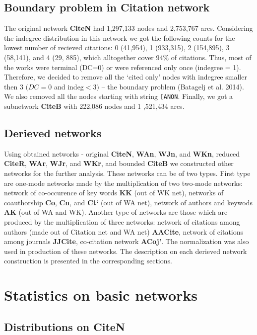 \documentclass[11pt]{article} %
\newcommand{\Remark}[1]{\ifodd\value{page} \normalmarginpar
 \else \reversemarginpar \fi \marginpar{{\footnotesize #1}} }
\begin{document}
\subsection{Boundary problem in Citation network}

The original network \textbf{CiteN} had 1,297,133 nodes and 2,753,767 arcs. Considering the indegree distribution in this network we got the following  counts for the lowest number of recieved citations: 0 (41,954), 1 (933,315), 2 (154,895), 3 (58,141), and 4 (29, 885), which alltogether  cover 94\% of citations. Thus, most of the works were terminal (DC=0) or were referenced only once (indegree = 1). Therefore, we decided to remove all the `cited only' nodes with indegree smaller then 3 $(DC = 0$ and indeg$<3)$ -- the boundary problem (Batagelj et al. 2014). We also removed all the nodes starting with string \texttt{[ANON}.  Finally, we got a subnetwork \textbf{CiteB} with  222,086 nodes and 1 ,521,434 arcs.
			
\subsection{Derieved networks}

\Remark{Move somewhere else}
Using obtained networks - original \textbf{CiteN}, \textbf{WAn}, \textbf{WJn}, and \textbf{WKn}, reduced \textbf{CiteR}, \textbf{WAr}, \textbf{WJr}, and \textbf{WKr}, and bounded \textbf{CiteB} we constructed other networks for the further analysis. These networks can be of two types. First type are one-mode networks made by the multiplication of two two-mode networks: network of co-occurence of key words \textbf{KK} (out of WK net), networks of coauthorship \textbf{Co}, \textbf{Cn}, and \textbf{Ct`} (out of WA net), network of authors and keywods \textbf{AK} (out of WA and WK). Another type of networks are those which are produced by the multiplication of three networks: network of citations among authors (made out of Citation net and WA net) \textbf{AACite}, network of citations among journals \textbf{JJCite}, co-citation network \textbf{ACoj'}. The normalization was also used in production of these networks. The description on each derieved network construction is presented in the corresponding sections. 

\section{Statistics on basic networks}

\normalsize
\subsection{Distributions on CiteN}
\end{document}
